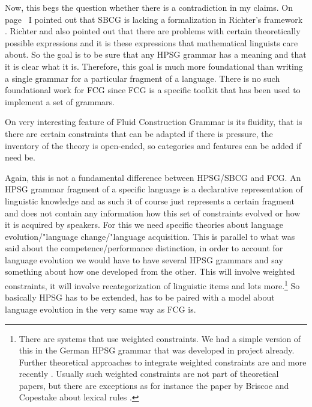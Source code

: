 Now, this begs the question whether there is a contradiction in my claims. On
page~\pageref{page-sbcg-formalization} I pointed out that SBCG is lacking a formalization in
Richter's framework \citep{Richter2004a-u}. Richter and also \citet{LM2006a} pointed out that there are problems with
certain theoretically possible expressions and it is these expressions that mathematical linguists care
about. So the goal is to be sure that any HPSG grammar has a meaning and that it is clear what it
is. Therefore, this goal is much more foundational than writing a single grammar for a particular fragment
of a language. There is no such foundational work for FCG since FCG is a specific toolkit that has been used
to implement a set of grammars.


On very interesting feature of Fluid Construction Grammar is its fluidity, that is there are certain
constraints that can be adapted if there is pressure, the inventory of the theory is open-ended, so
categories and features can be added if need be.

Again, this is not a fundamental difference between HPSG/SBCG and FCG. An HPSG grammar fragment of a
specific language is a declarative representation of linguistic knowledge and as such it of course
just represents a certain fragment and does not contain any information how this set of constraints
evolved or how it is acquired by speakers. For this we need specific theories about language
evolution/"language change/"language acquisition. This is parallel to what was said about the
competence/performance distinction, in order to account for language evolution we would have to have
several HPSG grammars and say something about how one developed from the other. This will involve
weighted constraints, it will involve recategorization of linguistic items and lots more.\footnote{%
  There are systems that use weighted constraints. We had a simple version of this in the
  German HPSG grammar that was developed in \verbmobil project \citep{MK2000a} already. Further
  theoretical approaches to integrate weighted constraints are  and more recently
  . Usually such weighted constraints are not part of theoretical papers,
  but there are exceptions as for instance the paper by Briscoe and Copestake about lexical rules \citep{BC99a}.
} So basically HPSG has to be extended, has to be paired with a model about
language evolution in the very same way as FCG is.



